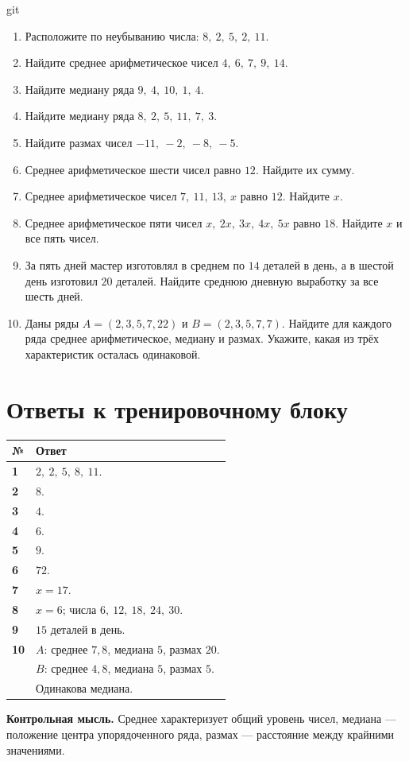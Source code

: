 git\documentclass[a4paper,12pt]{article}
\newcommand{\sectionline}{\par\vspace{-0.65em}\noindent{\color{accent!65}\rule{\linewidth}{0.45pt}}\par\vspace{0.25em}}
\begin{document}
\begin{enumerate}[label=\textbf{\arabic*.},itemsep=9pt,topsep=5pt]
\item Расположите по неубыванию числа: $8,\ 2,\ 5,\ 2,\ 11$.
\item Найдите среднее арифметическое чисел $4,\ 6,\ 7,\ 9,\ 14$.
\item Найдите медиану ряда $9,\ 4,\ 10,\ 1,\ 4$.
\item Найдите медиану ряда $8,\ 2,\ 5,\ 11,\ 7,\ 3$.
\item Найдите размах чисел $-11,\ -2,\ -8,\ -5$.
\item Среднее арифметическое шести чисел равно $12$. Найдите их сумму.
\item Среднее арифметическое чисел $7,\ 11,\ 13,\ x$ равно $12$. Найдите $x$.
\item Среднее арифметическое пяти чисел $x,\ 2x,\ 3x,\ 4x,\ 5x$ равно $18$. Найдите $x$ и все пять чисел.
\item За пять дней мастер изготовлял в среднем по $14$ деталей в день, а в шестой день изготовил $20$ деталей. Найдите среднюю дневную выработку за все шесть дней.
\item Даны ряды $A=(2,3,5,7,22)$ и $B=(2,3,5,7,7)$. Найдите для каждого ряда среднее арифметическое, медиану и размах. Укажите, какая из трёх характеристик осталась одинаковой.
\end{enumerate}

\clearpage
\section*{Ответы к тренировочному блоку}
\sectionline
\begin{center}
\begin{tabularx}{\linewidth}{@{}>{\bfseries}p{13mm}X@{}}
\toprule
№ & Ответ\\
\midrule
1 & $2,\ 2,\ 5,\ 8,\ 11$.\\
2 & $8$.\\
3 & $4$.\\
4 & $6$.\\
5 & $9$.\\
6 & $72$.\\
7 & $x=17$.\\
8 & $x=6$; числа $6,\ 12,\ 18,\ 24,\ 30$.\\
9 & $15$ деталей в день.\\
10 & $A$: среднее $7{,}8$, медиана $5$, размах $20$.\\
 & $B$: среднее $4{,}8$, медиана $5$, размах $5$.\\
 & Одинакова медиана.\\
\bottomrule
\end{tabularx}
\end{center}

\vspace{8mm}
\textcolor{darkaccent}{\textbf{Контрольная мысль.}} Среднее характеризует общий уровень чисел, медиана --- положение центра упорядоченного ряда, размах --- расстояние между крайними значениями.
\end{document}
